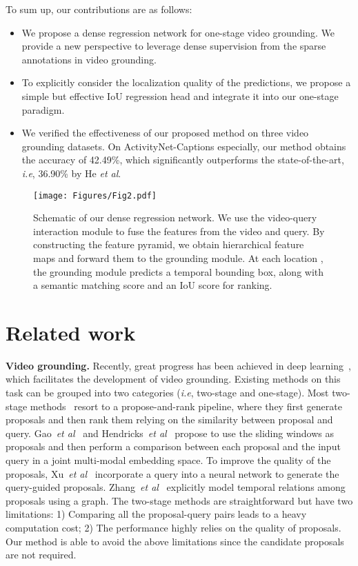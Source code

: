 \documentclass[10pt,twocolumn,letterpaper]{article}
\def\ie{\emph{i.e}\onedot} \def\Ie{\emph{I.e}\onedot}
\def\etal{\emph{et al}\onedot}
\begin{document}
	To sum up, our contributions are as follows:
	\begin{itemize}
		\item We propose a dense regression network for one-stage video grounding. We provide a new perspective to leverage dense supervision from the sparse annotations in video grounding.
		
		\item To explicitly consider the localization quality of the predictions, we propose a simple but effective IoU regression head and integrate it into our one-stage paradigm. 
		
		\item We verified the effectiveness of our proposed method on three video grounding datasets. On ActivityNet-Captions especially, our method obtains the accuracy of 42.49\%, which significantly outperforms the state-of-the-art, \ie, 36.90\% by He \etal\cite{he2019read}.
	\end{itemize}
	
	
	\begin{figure*}[!t]
		\centering
		\texttt{[image: Figures/Fig2.pdf]}
		\caption{Schematic of our dense regression network. We use the video-query interaction module to fuse the features from the video and query. By constructing the feature pyramid, we obtain hierarchical feature maps and forward them to the grounding module. At each location , the grounding module predicts a temporal bounding box, along with a semantic matching score and an IoU score for ranking.}
		\label{fig:overall}
	\end{figure*}


	\section{Related work}
	\noindent \textbf{Video grounding.}
	Recently, great progress has been achieved in deep learning~\cite{zhang2019collaborative,zhang2019whole,cao2019multi,guo2019nat,guo2020multi,guo2019auto,hu2019multi,pmlr-v80-cao18a,zhuang2018discrimination}, which facilitates the development of video grounding. Existing methods on this task can be grouped into two categories (\ie, two-stage and one-stage).
Most two-stage methods~\cite{gao2017tall,hendricks2018localizing, ge2019mac,chen2018temporally,liu2018cross,zhang2019cross} resort to a propose-and-rank pipeline, where they first generate proposals and then rank them relying on the similarity between proposal and query. Gao~\etal~\cite{gao2017tall} and Hendricks~\etal~\cite{hendricks2018localizing} propose to use the sliding windows as proposals and then perform a comparison between each proposal and the input query in a joint multi-modal embedding space. To improve the quality of the proposals, Xu~\etal~\cite{xu2019multilevel} incorporate a query into a neural network to generate the query-guided proposals. Zhang~\etal~\cite{zhang2019man} explicitly model temporal relations among proposals using a graph. The two-stage methods are straightforward but have two limitations: 1) Comparing all the proposal-query pairs
	leads to a heavy computation cost; 2) The performance highly relies on the quality of proposals. Our method is able to avoid the above limitations since the candidate proposals are not required.
	
\end{document}
